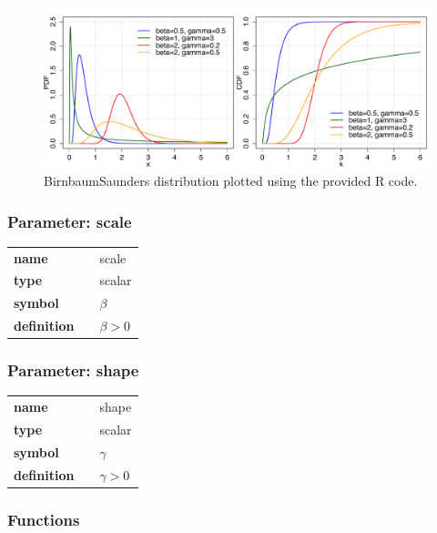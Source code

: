 \begin{figure}[ht!]
\centering
  \includegraphics[width=140mm]{pics/BirnbaumSaunders.pdf}
 \caption{BirnbaumSaunders distribution plotted using the provided R code.}
 \label{fig:BirnbaumSaunders}
\end{figure}

\subsubsection*{Parameter: scale}

\noindent\begin{tabular}{p{2cm}cl}
\textbf{name} & & scale \\
\textbf{type} & & scalar \\
\textbf{symbol} & & $\beta$  \\
\textbf{definition} & & $\beta > 0$
\end{tabular}
\subsubsection*{Parameter: shape}

\noindent\begin{tabular}{p{2cm}cl}
\textbf{name} & & shape \\
\textbf{type} & & scalar \\
\textbf{symbol} & & $\gamma$  \\
\textbf{definition} & & $\gamma > 0$
\end{tabular}
\subsubsection*{Functions}

